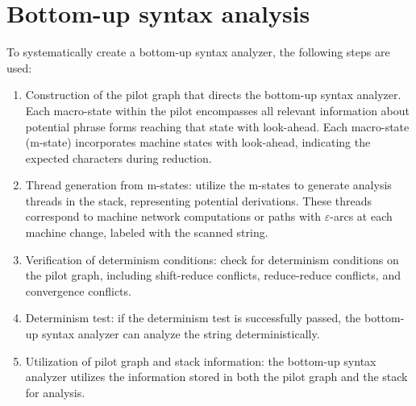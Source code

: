 \section{Bottom-up syntax analysis}

To systematically create a bottom-up syntax analyzer, the following steps are used:
\begin{enumerate}
    \item Construction of the pilot graph that directs the bottom-up syntax analyzer.
        Each macro-state within the pilot encompasses all relevant information about potential phrase forms reaching that state with look-ahead.
        Each macro-state (m-state) incorporates machine states with look-ahead, indicating the expected characters during reduction.
    \item Thread generation from m-states: utilize the m-states to generate analysis threads in the stack, representing potential derivations.
        These threads correspond to machine network computations or paths with $\varepsilon$-arcs at each machine change, labeled with the scanned string.
    \item Verification of determinism conditions: check for determinism conditions on the pilot graph, including shift-reduce conflicts, reduce-reduce conflicts, and convergence conflicts.
    \item Determinism test: if the determinism test is successfully passed, the bottom-up syntax analyzer can analyze the string deterministically.
    \item Utilization of pilot graph and stack information: the bottom-up syntax analyzer utilizes the information stored in both the pilot graph and the stack for analysis.
\end{enumerate}

